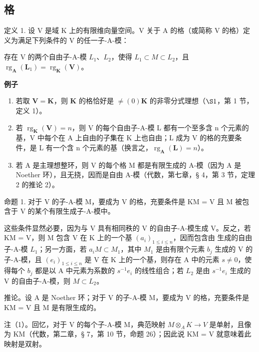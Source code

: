 \subsection{格}

定义 1. 设 V 是域 K 上的有限维向量空间。V 关于 A 的格（或简称 V 的格）定义为满足下列条件的 V 的任一子-A-模：

存在 V 的两个自由子-A-模 \(L_{1}\)、\(L_{2}\)，使得 \(L_{1} \subset M \subset L_{2}\)，且 \(\operatorname{rg}_{\mathbf{A}}(\mathbf{L}_{1}) = \operatorname{rg}_{\mathbf{K}}(\mathbf{V})\)。

\textbf{例子}\par

\begin{enumerate}
\def\labelenumi{(\arabic{enumi})}
\item
  若取 \(\mathbf{V} = \mathbf{K}\)，则 \(\mathbf{K}\) 的格恰好是 \(\neq (0)\)\(\mathbf{K}\) 的非零分式理想（\(\S 1\)，第 1 节，定义 1）。
\item
  若 \(\operatorname{rg}_{\mathbf{K}}(\mathbf{V}) = n\)，则 V 的每个自由子-A-模 L 都有一个至多含 n 个元素的基，V 中每个在 A 上自由的子集在 K 上也自由；L 成为 V 的格的充要条件，是 L 有一个含 n 个元素的基（换言之，\(\operatorname{rg}_{\mathbf{A}}(\mathbf{L}) = n\)）。
\item
  若 A 是主理想整环，则 V 的每个格 M 都是有限生成的 A-模（因为 A 是 Noether 环），且无挠，因而是自由 A-模（代数，第七章，§ 4，第 3 节，定理 2 的推论 2）。
\end{enumerate}

命题 1. 对于 V 的子-A-模 M，要成为 V 的格，充要条件是 KM = V 且 M 被包含于 V 的某个有限生成子-A-模中。

这些条件显然必要，因为与 V 具有相同秩的 V 的自由子-A-模生成 V。反之，若 KM = V，则 M 包含 V 在 K 上的一个基 \((a_{i})_{1 \leqslant i \leqslant n}\)，因而包含由  生成的自由子-A-模 \(L_{1}\)；另一方面，若 \(a_{i}\)\(M \subset M_{1}\)，其中 \(M_{1}\) 是由有限个元素 \(b_{j}\) 生成的 V 的子-A-模，且 \((e_{i})_{1 \leqslant i \leqslant n}\) 是 V 在 K 上的一个基，则存在 A 中的元素 \(s \neq 0\)，使得每个 \(b_{j}\) 都是以 A 中元素为系数的 \(s^{-1}e_{i}\) 的线性组合；若 \(L_{2}\) 是由 \(s^{-1}e_{i}\) 生成的 V 的自由子-A-模，则 \(M \subset L_{2}\)。

推论。设 A 是 Noether 环；对于 V 的子-A-模 M，要成为 V 的格，充要条件是 KM = V 且 M 是有限生成的。

注（1）。回忆，对于 V 的每个子-A-模 M，典范映射 \(M \otimes_{A} K \to V\) 是单射，且像为 KM（代数，第二章，§ 7，第 10 节，命题 26）；因此说 KM = V 就意味着此映射是双射。

